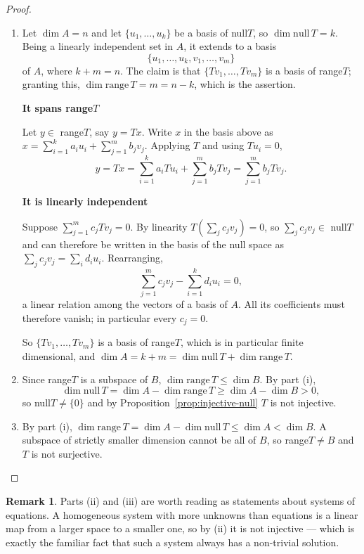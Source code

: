 \documentclass[11pt,a4paper]{article}
\theoremstyle{definition}
\newtheorem*{remark}{Remark}
\newcommand{\subhead}[1]{%
  \par\medskip\noindent\textbf{#1}\par\nobreak\smallskip}
\begin{document}
\begin{proof}
\begin{enumerate}
\item[i.] Let $\dim A=n$ and let $\{u_1,\dots,u_k\}$ be a basis of null$T$, so
$\dim\text{null}\,T=k$. Being a linearly independent set in $A$, it extends to
a basis
$$\{u_1,\dots,u_k,v_1,\dots,v_m\}$$
of $A$, where $k+m=n$. The claim is that $\{Tv_1,\dots,Tv_m\}$ is a basis of
range$T$; granting this, $\dim\text{range}\,T=m=n-k$, which is the assertion.

\subhead{It spans range$T$} Let $y\in$ range$T$, say $y=Tx$. Write $x$ in the
basis above as $x=\sum_{i=1}^{k}a_iu_i+\sum_{j=1}^{m}b_jv_j$. Applying $T$ and
using $Tu_i=0$,
$$y=Tx=\sum_{i=1}^{k}a_iTu_i+\sum_{j=1}^{m}b_jTv_j=\sum_{j=1}^{m}b_jTv_j.$$

\subhead{It is linearly independent} Suppose $\sum_{j=1}^{m}c_jTv_j=0$. By
linearity $T\left(\sum_{j}c_jv_j\right)=0$, so $\sum_{j}c_jv_j\in$ null$T$ and
can therefore be written in the basis of the null space as
$\sum_{j}c_jv_j=\sum_{i}d_iu_i$. Rearranging,
$$\sum_{j=1}^{m}c_jv_j-\sum_{i=1}^{k}d_iu_i=0,$$
a linear relation among the vectors of a basis of $A$. All its coefficients
must therefore vanish; in particular every $c_j=0$.

So $\{Tv_1,\dots,Tv_m\}$ is a basis of range$T$, which is in particular finite
dimensional, and $\dim A=k+m=\dim\text{null}\,T+\dim\text{range}\,T$.

\item[ii.] Since range$T$ is a subspace of $B$, $\dim\text{range}\,T\leq\dim B$.
By part (i),
$$\dim \text{null}\,T=\dim A-\dim \text{range}\,T\geq \dim A-\dim B>0,$$
so null$T\neq\{0\}$ and by Proposition~\ref{prop:injective-null} $T$ is not
injective.

\item[iii.] By part (i), $\dim\text{range}\,T=\dim A-\dim\text{null}\,T\leq\dim
A<\dim B$. A subspace of strictly smaller dimension cannot be all of $B$, so
range$T\neq B$ and $T$ is not surjective.
\end{enumerate}
\end{proof}

\begin{remark}
Parts (ii) and (iii) are worth reading as statements about systems of
equations. A homogeneous system with more unknowns than equations is a linear
map from a larger space to a smaller one, so by (ii) it is not injective ---
which is exactly the familiar fact that such a system always has a non-trivial
solution.
\end{remark}
\end{document}
